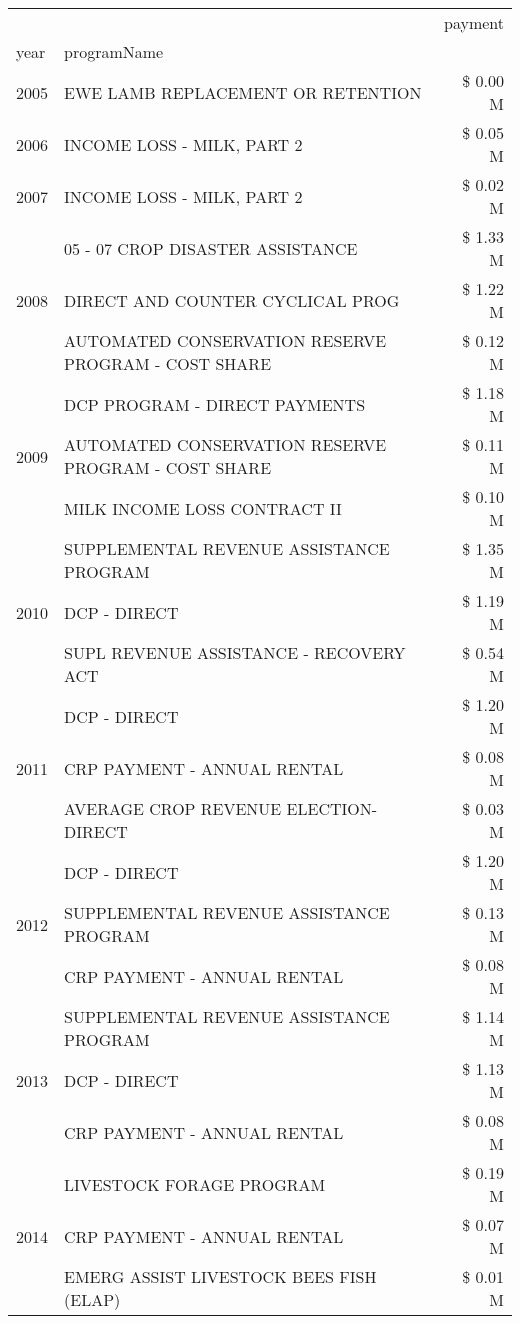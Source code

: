 \begin{tabular}{llr}
\toprule
 &  & payment \\
year & programName &  \\
\midrule
2005 & EWE LAMB REPLACEMENT OR RETENTION & \$ 0.00 M \\
\cline{1-3}
2006 & INCOME LOSS - MILK, PART 2 & \$ 0.05 M \\
\cline{1-3}
2007 & INCOME LOSS - MILK, PART 2 & \$ 0.02 M \\
\cline{1-3}
\multirow[t]{3}{*}{2008} & 05 - 07 CROP DISASTER ASSISTANCE & \$ 1.33 M \\
 & DIRECT AND COUNTER CYCLICAL PROG & \$ 1.22 M \\
 & AUTOMATED CONSERVATION RESERVE PROGRAM - COST SHARE & \$ 0.12 M \\
\cline{1-3}
\multirow[t]{3}{*}{2009} & DCP PROGRAM - DIRECT PAYMENTS & \$ 1.18 M \\
 & AUTOMATED CONSERVATION RESERVE PROGRAM - COST SHARE & \$ 0.11 M \\
 & MILK INCOME LOSS CONTRACT II & \$ 0.10 M \\
\cline{1-3}
\multirow[t]{3}{*}{2010} & SUPPLEMENTAL REVENUE ASSISTANCE PROGRAM & \$ 1.35 M \\
 & DCP - DIRECT & \$ 1.19 M \\
 & SUPL REVENUE ASSISTANCE - RECOVERY ACT & \$ 0.54 M \\
\cline{1-3}
\multirow[t]{3}{*}{2011} & DCP - DIRECT & \$ 1.20 M \\
 & CRP PAYMENT - ANNUAL RENTAL & \$ 0.08 M \\
 & AVERAGE CROP REVENUE ELECTION-DIRECT & \$ 0.03 M \\
\cline{1-3}
\multirow[t]{3}{*}{2012} & DCP - DIRECT & \$ 1.20 M \\
 & SUPPLEMENTAL REVENUE ASSISTANCE PROGRAM & \$ 0.13 M \\
 & CRP PAYMENT - ANNUAL RENTAL & \$ 0.08 M \\
\cline{1-3}
\multirow[t]{3}{*}{2013} & SUPPLEMENTAL REVENUE ASSISTANCE PROGRAM & \$ 1.14 M \\
 & DCP - DIRECT & \$ 1.13 M \\
 & CRP PAYMENT - ANNUAL RENTAL & \$ 0.08 M \\
\cline{1-3}
\multirow[t]{3}{*}{2014} & LIVESTOCK FORAGE PROGRAM & \$ 0.19 M \\
 & CRP PAYMENT - ANNUAL RENTAL & \$ 0.07 M \\
 & EMERG ASSIST LIVESTOCK BEES FISH (ELAP) & \$ 0.01 M \\

\end{tabular}
